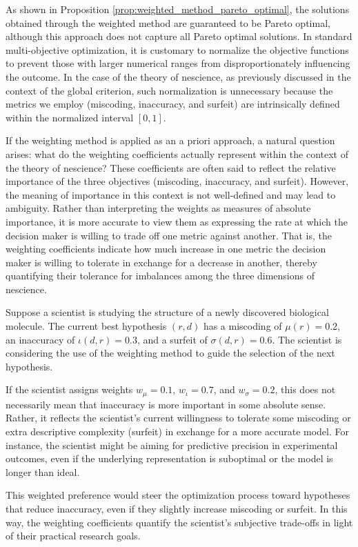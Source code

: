 As shown in Proposition \ref{prop:weighted_method_pareto_optimal}, the solutions obtained through the weighted method are guaranteed to be Pareto optimal, although this approach does not capture all Pareto optimal solutions. In standard multi-objective optimization, it is customary to normalize the objective functions to prevent those with larger numerical ranges from disproportionately influencing the outcome. In the case of the theory of nescience, as previously discussed in the context of the global criterion, such normalization is unnecessary because the metrics we employ (miscoding, inaccuracy, and surfeit) are intrinsically defined within the normalized interval $[0, 1]$.

If the weighting method is applied as an a priori approach, a natural question arises: what do the weighting coefficients actually represent within the context of the theory of nescience? These coefficients are often said to reflect the relative importance of the three objectives (miscoding, inaccuracy, and surfeit). However, the meaning of importance in this context is not well-defined and may lead to ambiguity. Rather than interpreting the weights as measures of absolute importance, it is more accurate to view them as expressing the rate at which the decision maker is willing to trade off one metric against another. That is, the weighting coefficients indicate how much increase in one metric the decision maker is willing to tolerate in exchange for a decrease in another, thereby quantifying their tolerance for imbalances among the three dimensions of nescience.

\begin{example}
Suppose a scientist is studying the structure of a newly discovered biological molecule. The current best hypothesis $(r, d)$ has a miscoding of $\mu(r) = 0.2$, an inaccuracy of $\iota(d, r) = 0.3$, and a surfeit of $\sigma(d, r) = 0.6$. The scientist is considering the use of the weighting method to guide the selection of the next hypothesis.

If the scientist assigns weights $w_\mu = 0.1$, $w_\iota = 0.7$, and $w_\sigma = 0.2$, this does not necessarily mean that inaccuracy is more important in some absolute sense. Rather, it reflects the scientist's current willingness to tolerate some miscoding or extra descriptive complexity (surfeit) in exchange for a more accurate model. For instance, the scientist might be aiming for predictive precision in experimental outcomes, even if the underlying representation is suboptimal or the model is longer than ideal.

This weighted preference would steer the optimization process toward hypotheses that reduce inaccuracy, even if they slightly increase miscoding or surfeit. In this way, the weighting coefficients quantify the scientist's subjective trade-offs in light of their practical research goals.
\end{example}

